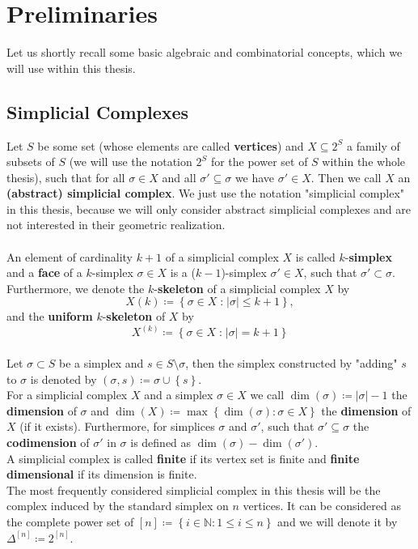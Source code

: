 
\manualmark
{}

\chapter*{Preliminaries}

\label{Preliminaries}

Let us shortly recall some basic algebraic and combinatorial concepts, which we will use within this thesis.

\section*{Simplicial Complexes}

Let \(S\) be some set (whose elements are called \textbf{vertices}) and \(X\subseteq 2^S\) a family of subsets of \(S\) (we will use the notation \(2^S\) for the power set of \(S\) within the whole thesis), such that for all \(\sigma\in X\) and all \(\sigma'\subseteq\sigma\) we have \(\sigma'\in X\). Then we call \(X\) an \textbf{(abstract) simplicial complex}. We just use the notation "simplicial complex" in this thesis, because we will only consider abstract simplicial complexes and are not interested in their geometric realization.\\
\\
An element of cardinality \(k+1\) of a simplicial complex \(X\) is called \(k\)-\textbf{simplex} and a \textbf{face} of a \(k\)-simplex \(\sigma\in X\) is a (\(k-1\))-simplex \(\sigma'\in X\), such that \(\sigma'\subset\sigma\). Furthermore, we denote the \(k\)-\textbf{skeleton} of a simplicial complex \(X\) by
\[
X(k)\coloneqq \left\{\sigma\in X\;\text{:}\;\left|\sigma\right|\leq k+1\right\},
\]
and the \textbf{uniform} \(k\)-\textbf{skeleton} of \(X\) by
\[
X^{(k)}\coloneqq \left\{\sigma\in X\;\text{:}\;\left|\sigma\right|=k+1\right\}
\]
\\
Let \(\sigma\subset S\) be a simplex and \(s\in S\setminus\sigma\), then the simplex constructed by "adding" \(s\) to \(\sigma\) is denoted by \((\sigma,s)\coloneqq \sigma\cup\left\{s\right\}\).\\
For a simplicial complex \(X\) and a simplex \(\sigma\in X\) we call \(\dim(\sigma)\coloneqq |\sigma|-1\) the \textbf{dimension} of \(\sigma\) and \(\dim(X)\coloneqq \max\left\{\dim(\sigma):\sigma\in X\right\}\) the \textbf{dimension} of \(X\) (if it exists). Furthermore, for simplices \(\sigma\) and \(\sigma'\), such that \(\sigma'\subseteq\sigma\) the \textbf{codimension} of \(\sigma'\) in \(\sigma\) is defined as \(\dim(\sigma)-\dim(\sigma')\). 
\\
A simplicial complex is called \textbf{finite} if its vertex set is finite and \textbf{finite dimensional} if its dimension is finite.\\
The most frequently considered simplicial complex in this thesis will be the complex induced by the standard simplex on \(n\) vertices. It can be considered as the complete power set of \([n]\coloneqq\left\{i\in\mathbb{N}:1\leq i\leq n\right\}\) and we will denote it by \(\Delta^{[n]}\coloneqq 2^{[n]}\).

